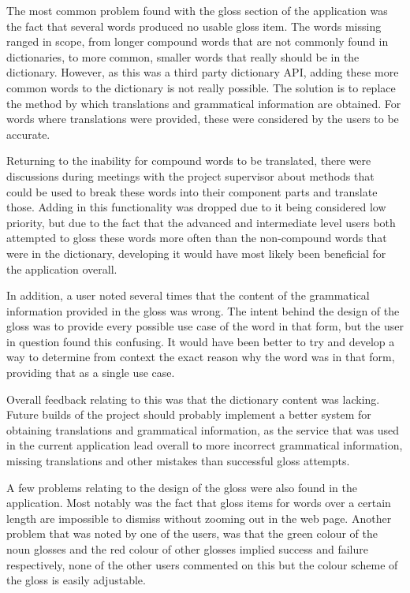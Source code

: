 The most common problem found with the gloss section of the application was the fact that several words produced no usable gloss item. The words missing ranged in scope, from longer compound words that are not commonly found in dictionaries, to more common, smaller words that really should be in the dictionary. However, as this was a third party dictionary API, adding these more common words to the dictionary is not really possible. The solution is to replace the method by which translations and grammatical information are obtained. For words where translations were provided, these were considered by the users to be accurate. 

Returning to the inability for compound words to be translated, there were discussions during meetings with the project supervisor about methods that could be used  to break these words into their component parts and translate those. Adding in this functionality was dropped due to it being considered low priority, but due to the fact that the advanced and intermediate level users both attempted to gloss these words more often than the non-compound words that were in the dictionary, developing it would have most likely been beneficial for the application overall. 

In addition, a user noted several times that the content of the grammatical information provided in the gloss was wrong. The intent behind the design of the gloss was to provide every possible use case of the word in that form, but the user in question found this confusing. It would have been better to try and develop a way to determine from context the exact reason why the word was in that form, providing that as a single use case.  

Overall feedback relating to this was that the dictionary content was lacking. Future builds of the project should probably implement a better system for obtaining translations and grammatical information, as the service that was used in the current application lead overall to more incorrect grammatical information, missing translations and other mistakes than successful gloss attempts. 

A few problems relating to the design of the gloss were also found in the application. Most notably was the fact that gloss items for words over a certain length are impossible to dismiss without zooming out in the web page. Another problem that was noted by one of the users, was that the green colour of the noun glosses and the red colour of other glosses implied success and failure respectively, none of the other users commented on this but the colour scheme of the gloss is easily adjustable.


